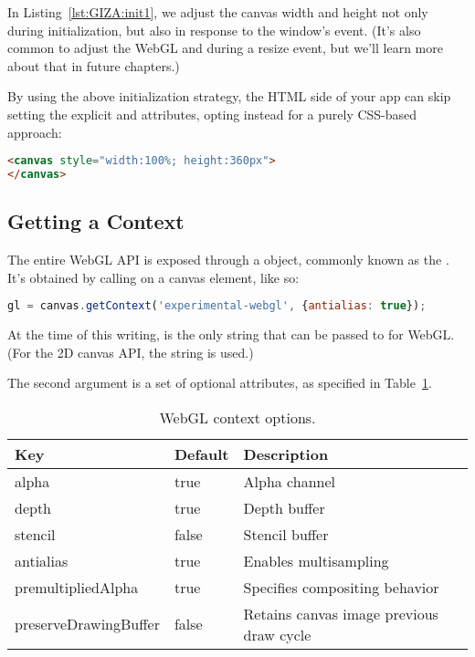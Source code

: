In Listing~\ref{lst:GIZA:init1}, we adjust the canvas width and height not only during initialization, but also in response to the window's   event.  (It's also common to adjust the WebGL  and  during a resize event, but we'll learn more about that in future chapters.)

By using the above initialization strategy, the HTML side of your app can skip setting the explicit  and  attributes, opting instead for a purely CSS-based approach:

\begin{lstlisting}[language=HTML]
<canvas style="width:100%; height:360px">
</canvas>
\end{lstlisting}

\subsection{Getting a Context}
\label{sec:context}

The entire WebGL API is exposed through a   object, commonly known as the  .  It's obtained by calling   on a canvas element, like so:

\begin{lstlisting}[language=JavaScript]
  gl = canvas.getContext('experimental-webgl', {antialias: true});
\end{lstlisting}

At the time of this writing,   is the only string that can be passed to  for WebGL.  (For the 2D canvas API, the string  is used.)

The second argument is a set of optional attributes, as specified in Table~\ref{tab:ContextAttributes}.

\begin{table}[htb]\centering
  \begin{tabular}{lll}
    \hline
    Key & Default & Description \\
    \hline
    alpha & true & Alpha channel \\
    depth & true & Depth buffer \\
    stencil & false & Stencil buffer \\
    antialias & true & Enables multisampling \\
    premultipliedAlpha & true & Specifies compositing behavior \\
    preserveDrawingBuffer & false & Retains canvas image previous draw cycle \\
    \hline
  \end{tabular}
  \caption{WebGL context options.}
  \label{tab:ContextAttributes}
\end{table}

